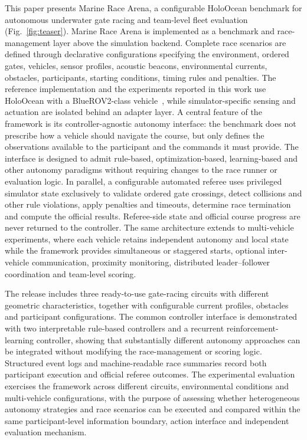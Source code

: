 This paper presents Marine Race Arena, a configurable HoloOcean benchmark for
autonomous underwater gate racing and team-level fleet evaluation
(Fig.~\ref{fig:teaser}). Marine Race Arena is implemented as a benchmark and
race-management layer above the simulation backend. Complete race scenarios are
defined through declarative configurations specifying the environment, ordered
gates, vehicles, sensor profiles, acoustic beacons, environmental currents,
obstacles, participants, starting conditions, timing rules and penalties. The
reference implementation and the experiments reported in this work use
HoloOcean with a BlueROV2-class vehicle~\cite{vonbenzon2022bluerov2}, while
simulator-specific sensing and actuation are isolated behind an adapter layer.
A central feature of the framework is its controller-agnostic autonomy
interface: the benchmark does not prescribe how a vehicle should navigate the
course, but only defines the observations available to the participant and the
commands it must provide. The interface is designed to admit rule-based,
optimization-based, learning-based and other autonomy paradigms without
requiring changes to the race runner or evaluation logic. In parallel, a
configurable automated referee uses privileged simulator state exclusively to
validate ordered gate crossings, detect collisions and other rule violations,
apply penalties and timeouts, determine race termination and compute the
official results. Referee-side state and official course progress are never
returned to the controller. The same architecture extends to multi-vehicle
experiments, where each vehicle retains independent autonomy and local state
while the framework provides simultaneous or staggered starts, optional
inter-vehicle communication, proximity monitoring, distributed
leader--follower coordination and team-level scoring.

The release includes three ready-to-use gate-racing circuits with different
geometric characteristics, together with configurable current profiles,
obstacles and participant configurations. The common controller interface is
demonstrated with two interpretable rule-based controllers and a recurrent
reinforcement-learning controller, showing that substantially different autonomy
approaches can be integrated without modifying the race-management or scoring
logic. Structured event logs and machine-readable race summaries record both
participant execution and official referee outcomes. The experimental
evaluation exercises the framework across different circuits, environmental
conditions and multi-vehicle configurations, with the purpose of assessing
whether heterogeneous autonomy strategies and race scenarios can be executed
and compared within the same participant-level information boundary, action
interface and independent evaluation mechanism.

